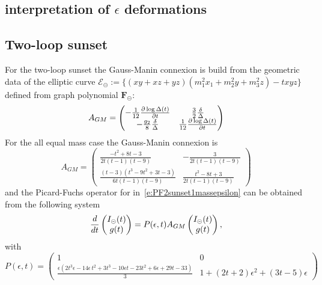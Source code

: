 \documentclass[a4paper,12pt]{article}
\numberwithin{equation}{section}
\numberwithin{figure}{subsection}
\theoremstyle{plain}
\theoremstyle{plain}
\theoremstyle{definition}
\theoremstyle{plain}
\theoremstyle{remark}
\theoremstyle{plain}
\def\su{\circleddash}
\begin{document}
\subsection{interpretation of $\epsilon$ deformations}

\subsection{Two-loop sunset}

For the two-loop sunset the Gauss-Manin connexion is build from the
geometric data of the elliptic curve
$\mathscr{E}_\su:=\{(xy+xz+yz)(m_1^2x_1+m_2^2y+m_3^2z)-t xyz\}$
defined from graph polynomial $\textbf{F}_\su$:
\begin{equation}
  \label{eq:AGM}
  A_{GM}=
  \begin{pmatrix}
    -{1\over 12}{\partial \log\Delta(t)\over \partial t} &{3\over
      2}{\delta\over \Delta}\cr
    -{g_2\over8}{\delta\over\Delta}&{1\over12}{\partial\log\Delta(t)\over\partial t}
  \end{pmatrix}
\end{equation}
For the all equal mass case the Gauss-Manin connexion is
\begin{equation}
  \label{eq:AGM2sunset1mass}
  A_{GM}=\begin{pmatrix}
\frac{-t^{2}+8 t -3}{2 t \left(t -1\right) \left(t -9\right)} & -\frac{3}{2 t \left(t -1\right) \left(t -9\right)} 
\\
 \frac{\left(t -3\right) \left(t^{3}-9 t^{2}+3 t -3\right)}{6 t \left(t -1\right) \left(t -9\right)} & \frac{t^{2}-8 t +3}{2 t \left(t -1\right) \left(t -9\right)} 
\end{pmatrix}
\end{equation}
and the
Picard-Fuchs operator for
in~\eqref{e:PF2sunset1massepsilon} can be obtained from the following
system
\begin{equation}
  {d\over dt}
  \begin{pmatrix}
    I_\su(t)\cr g(t)
  \end{pmatrix} =P(\epsilon,t) A_{GM} \begin{pmatrix}
    I_\su(t)\cr g(t)
  \end{pmatrix},
\end{equation}
with
\begin{equation}
  P(\epsilon,t)=
  \begin{pmatrix}
    1 & 0 
\\
 \frac{\epsilon  \left(2 t^{3} \epsilon -14 \epsilon  \,t^{2}+3 t^{3}-10 \epsilon  t -23 t^{2}+6 \epsilon +29 t -33\right)}{3} & 1+\left(2 t +2\right) \epsilon^{2}+\left(3 t -5\right) \epsilon  
  \end{pmatrix}
\end{equation}
\end{document}
